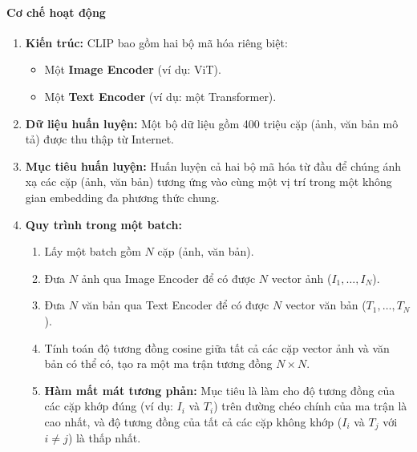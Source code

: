 \paragraph{Cơ chế hoạt động}
\begin{enumerate}
    \item \textbf{Kiến trúc:} CLIP bao gồm hai bộ mã hóa riêng biệt:
        \begin{itemize}
            \item Một \textbf{Image Encoder} (ví dụ: ViT).
            \item Một \textbf{Text Encoder} (ví dụ: một Transformer).
        \end{itemize}
    \item \textbf{Dữ liệu huấn luyện:} Một bộ dữ liệu gồm 400 triệu cặp (ảnh, văn bản mô tả) được thu thập từ Internet.
    \item \textbf{Mục tiêu huấn luyện:} Huấn luyện cả hai bộ mã hóa từ đầu để chúng ánh xạ các cặp (ảnh, văn bản) tương ứng vào cùng một vị trí trong một không gian embedding đa phương thức chung.
    \item \textbf{Quy trình trong một batch:}
        \begin{enumerate}
            \item Lấy một batch gồm $N$ cặp (ảnh, văn bản).
            \item Đưa $N$ ảnh qua Image Encoder để có được $N$ vector ảnh ($I_1, \dots, I_N$).
            \item Đưa $N$ văn bản qua Text Encoder để có được $N$ vector văn bản ($T_1, \dots, T_N$).
            \item Tính toán độ tương đồng cosine giữa tất cả các cặp vector ảnh và văn bản có thể có, tạo ra một ma trận tương đồng $N \times N$.
            \item \textbf{Hàm mất mát tương phản:} Mục tiêu là làm cho độ tương đồng của các cặp khớp đúng (ví dụ: $I_i$ và $T_i$) trên đường chéo chính của ma trận là cao nhất, và độ tương đồng của tất cả các cặp không khớp ($I_i$ và $T_j$ với $i \neq j$) là thấp nhất.
        \end{enumerate}
\end{enumerate}

\begin{center}
    \label{fig:clip_contrastive_learning}
\end{center}

